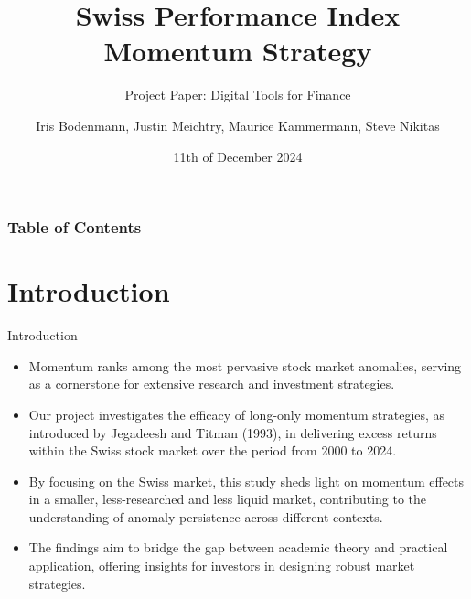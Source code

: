 \documentclass[10pt]{beamer}
\title{Swiss Performance Index Momentum Strategy}
\subtitle{Project Paper: Digital Tools for Finance}
\author{Iris Bodenmann, Justin Meichtry, Maurice Kammermann, Steve Nikitas}
\date{11th of December 2024}
\institute[]{Igor Pozdeev\\Department of Finance\\ University of Zurich}
\begin{document}
\begin{frame}
\maketitle
\end{frame}

\begin{frame}
\frametitle{Table of Contents}
\tableofcontents
\end{frame}

\section{Introduction}
\begin{frame}{Introduction}
\begin{itemize}
    \item Momentum ranks among the most pervasive stock market anomalies, serving as a cornerstone for extensive research and investment strategies.
    \item Our project investigates the efficacy of long-only momentum strategies, as introduced by Jegadeesh and Titman (1993), in delivering excess returns within the Swiss stock market over the period from 2000 to 2024.
    \item By focusing on the Swiss market, this study sheds light on momentum effects in a smaller, less-researched and less liquid market, contributing to the understanding of anomaly persistence across different contexts.
    \item The findings aim to bridge the gap between academic theory and practical application, offering insights for investors in designing robust market strategies.
\end{itemize}
\end{frame}



\end{document}
